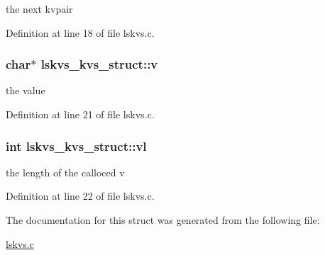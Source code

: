 the next kvpair 



Definition at line 18 of file lskvs.\-c.

\hypertarget{structlskvs__kvs__struct_a27a0ae4415b6d65c8a9f9fac11c130f9}{
\subsubsection[{v}]{\setlength{\rightskip}{0pt plus 5cm}char$\ast$ lskvs\-\_\-kvs\-\_\-struct\-::v}}\label{structlskvs__kvs__struct_a27a0ae4415b6d65c8a9f9fac11c130f9}


the value 



Definition at line 21 of file lskvs.\-c.

\hypertarget{structlskvs__kvs__struct_aa1c980ae62cdf78d8b358b3a51deda6a}{
\subsubsection[{vl}]{\setlength{\rightskip}{0pt plus 5cm}int lskvs\-\_\-kvs\-\_\-struct\-::vl}}\label{structlskvs__kvs__struct_aa1c980ae62cdf78d8b358b3a51deda6a}


the length of the calloced v 



Definition at line 22 of file lskvs.\-c.



The documentation for this struct was generated from the following file\-:\begin{DoxyCompactItemize}
\item 
\hyperlink{lskvs_8c}{lskvs.\-c}\end{DoxyCompactItemize}
